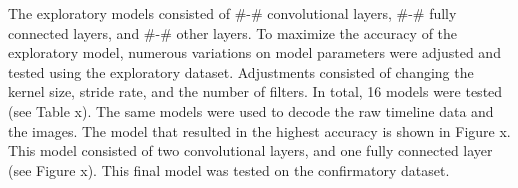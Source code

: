 

The exploratory models consisted of #-# convolutional layers, #-# fully connected layers, and #-# other layers. To maximize the accuracy of the exploratory model, numerous variations on model parameters were adjusted and tested using the exploratory dataset. Adjustments consisted of changing the kernel size, stride rate, and the number of filters. In total, 16 models were tested (see Table x). The same models were used to decode the raw timeline data and the images. The model that resulted in the highest accuracy is shown in Figure x. This model consisted of two convolutional layers, and one fully connected layer (see Figure x). This final model was tested on the confirmatory dataset.


